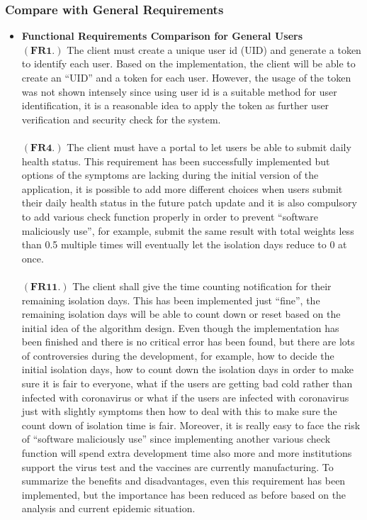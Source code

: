 \documentclass[12pt]{article}
\begin{document}
\subsubsection{Compare with General Requirements}
\begin{itemize}
\item\textbf{Functional Requirements Comparison for General Users}
\\$\mathbf{(FR1.)}$ The client must create a unique user id (UID) and generate a token to identify each user. Based on the implementation, the client will be able to create an ``UID'' and a token for each user. However, the usage of the token was not shown intensely since using user id is a suitable method for user identification, it is a reasonable idea to apply the token as further user verification and security check for the system.
\\
\\$\mathbf{(FR4.)}$ The client must have a portal to let users be able to submit daily health status. This requirement has been successfully implemented but options of the symptoms are lacking during the initial version of the application, it is possible to add more different choices when users submit their daily health status in the future patch update and it is also compulsory to add various check function properly in order to prevent ``software maliciously use'', for example, submit the same result with total weights less than 0.5 multiple times will eventually let the isolation days reduce to 0 at once.
\\
\\$\mathbf{(FR11.)}$ The client shall give the time counting notification for their remaining isolation days. This has been implemented just ``fine'', the remaining isolation days will be able to count down or reset based on the initial idea of the algorithm design. Even though the implementation has been finished and there is no critical error has been found, but there are lots of controversies during the development, for example, how to decide the initial isolation days, how to count down the isolation days in order to make sure it is fair to everyone, what if the users are getting bad cold rather than infected with coronavirus or what if the users are infected with coronavirus just with slightly symptoms then how to deal with this to make sure the count down of isolation time is fair. Moreover, it is really easy to face the risk of ``software maliciously use'' since implementing another various check function will spend extra development time also more and more institutions support the virus test and the vaccines are currently manufacturing. To summarize the benefits and disadvantages, even this requirement has been implemented, but the importance has been reduced as before based on the analysis and current epidemic situation.

\end{itemize}
\end{document}
